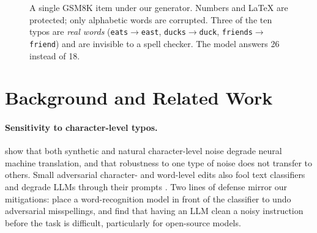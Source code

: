 \documentclass[11pt]{article}
\newcommand{\arrow}{$\rightarrow$}
\begin{document}
\begin{figure}[tbp]
\centering
\footnotesize
\setlength{\fboxsep}{4pt}
\caption{A single GSM8K item under our generator. Numbers and \LaTeX{} are
protected; only alphabetic words are corrupted. Three of the ten typos are
\emph{real words} (\texttt{eats\arrow east}, \texttt{ducks\arrow duck},
\texttt{friends\arrow friend}) and are invisible to a spell checker. The model
answers 26 instead of 18.}
\label{fig:example}
\end{figure}

\section{Background and Related Work}

\paragraph{Sensitivity to character-level typos.}
\citet{belinkov2018} show that both synthetic and natural character-level noise
degrade neural machine translation, and that robustness to one type of noise
does not transfer to others. Small adversarial character- and word-level edits
also fool text classifiers \citep{ebrahimi2018,jin2020} and degrade LLMs through
their prompts \citep{zhu2024}. Two lines of defense mirror our mitigations:
\citet{pruthi2019} place a word-recognition model in front of the classifier to
undo adversarial misspellings, and \citet{wang2024noisy} find that having an LLM
clean a noisy instruction before the task is difficult, particularly for
open-source models.
\end{document}
